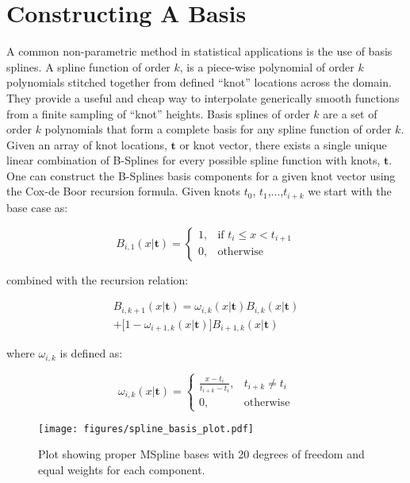 \section{Constructing A Basis} \label{sec:basis_splines}

A common non-parametric method in statistical applications is the use of basis splines. A spline function of order $k$, 
is a piece-wise polynomial of order $k$ polynomials stitched together from defined ``knot'' locations across the domain. 
They provide a useful and cheap way to interpolate generically smooth functions from a finite sampling of ``knot'' heights. 
Basis splines of order $k$ are a set of order $k$ polynomials that form a complete basis for any spline function of order $k$. 
Given an array of knot locations, $\mathbf{t}$ or knot vector, there exists a single unique linear combination of B-Splines for 
every possible spline function with knots, $\mathbf{t}$. One can construct the B-Splines basis components for a given knot vector 
using the Cox-de Boor recursion formula. Given knots $t_0$, $t_1$,...,$t_{i+k}$ we start with the base case as:

\begin{equation}
    B_{i,1}(x | \mathbf{t}) = 
    \begin{cases}
        1, & \text{if } t_i \leq x < t_{i+1} \\
        0, & \text{otherwise}
    \end{cases}
\end{equation}

\noindent combined with the recursion relation:

\begin{multline*}
    B_{i,k+1}(x | \mathbf{t}) = \omega_{i,k}(x | \mathbf{t})B_{i,k}(x | \mathbf{t})\\
                                + \big[1-\omega_{i+1,k}(x | \mathbf{t})\big] B_{i+1,k}(x | \mathbf{t})
\end{multline*}

\noindent where $\omega_{i,k}$ is defined as:

\begin{equation}
\omega_{i,k}(x | \mathbf{t}) =
\begin{cases}
    \frac{x-t_i}{t_{i+k}-t_i}, & t_{i+k} \neq t_i \\
    0, & \text{otherwise}
\end{cases}
\end{equation}

\begin{figure}[ht!]
        \texttt{[image: figures/spline\_basis\_plot.pdf]}
        \caption{Plot showing proper MSpline bases with 20 degrees of freedom and equal weights for each component.}
        \label{fig:spline_basis}
\end{figure}

